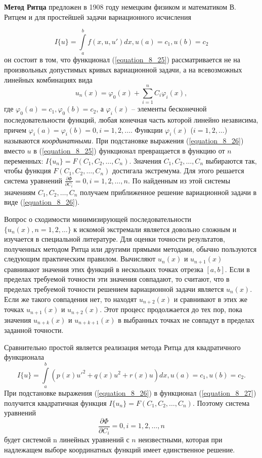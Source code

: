 	{\bf Метод Ритца} предложен в 1908 году немецким физиком и   математиком В. Ритцем и для простейшей задачи вариационного исчисления

	\newpage
	\begin{equation}
	\label{equation_8_25}
		\textstyle I\{u\}= \int\limits_a^b f(x, u, u')dx, u(a)=c_1,u(b)=c_2
	\end{equation}
	он состоит в том, что функционал (\ref{equation_8_25}) рассматривается не на произвольных допустимых кривых вариационной задачи, а на всевозможных линейных комбинациях вида
	\begin{equation}
	\label{equation_8_26}
	 	\textstyle u_n(x) = \varphi_0(x) + \sum_{i = 1}^{n}C_i\varphi_i (x),
	\end{equation}
	где $\varphi_0(a)=c_1, \varphi_0(b)=c_2$, а $\varphi_i(x)$ – элементы бесконечной последовательности функций, любая конечная часть которой линейно независима, причем $\varphi_i(a)=\varphi_i(b)=0, i=1, 2,\ldots$. Функции $\varphi_i(x)$ ($i=1, 2, \ldots$) называются {\it координатными.} При подстановке выражения (\ref{equation_8_26}) вместо $u$ в (\ref{equation_8_25}) функционал превращается в функцию от $n$ переменных: $I\{u_n\}=F(C_1,C_2,\ldots,C_n)$. Значения $C_1,C_2,\ldots,C_n$ выбираются так, чтобы функция $F(C_1,C_2,\ldots,C_n)$ достигала экстремума. Для этого решается система уравнений $\frac{\partial \Phi}{\partial C_i} = 0, i=1,2,\ldots, n.$ По найденным из этой системы значениям $C_1,C_2,\ldots,C_n$ получаем приближенное решение вариационной задачи в виде (\ref{equation_8_26}).

	Вопрос о сходимости минимизирующей последовательности $\{u_n(x), n=1, 2, \ldots\}$ к искомой экстремали является довольно сложным и изучается в специальной литературе. Для оценки точности результатов, полученных методом Ритца или другими прямыми методами, обычно пользуются следующим практическим правилом. Вычисляют $u_n(x)$ и $u_{n+1}(x)$ сравнивают значения этих функций в нескольких точках отрезка $[a, b]$. Если в пределах требуемой точности эти значения совпадают, то считают, что в пределах требуемой точности решением вариационной задачи является $u_n(x)$. Если же такого совпадения нет, то находят $u_{n+2}(x)$ и сравнивают в этих же точках $u_{n+1}(x)$ и $u_{n+2}(x)$. Этот процесс продолжается до тех пор, пока значения $u_{n+k}(x)$ и $u_{n+k+1}(x)$ в выбранных точках не совпадут в пределах заданной точности.

	Сравнительно простой является реализация метода Ритца для квадратичного функционала
	\begin{equation}
	\label{equation_8_27}
		\textstyle I\{u\}= \int\limits_a^b (p(x)u'^2+q(x)u^2+r(x)u)dx, u(a)=c_1, u(b)=c_2.
	\end{equation}
	При подстановке выражения (\ref{equation_8_26}) в функционал (\ref{equation_8_27}) получится квадратичная функция $I\{u_n\}=F(C_1,C_2,\ldots,C_n)$. Поэтому система уравнений
	$$\frac{\partial \Phi}{\partial C_i} = 0, i = 1,2,\ldots, n$$
	будет системой n линейных уравнений с $n$ неизвестными, которая при надлежащем выборе координатных функций имеет единственное решение.


